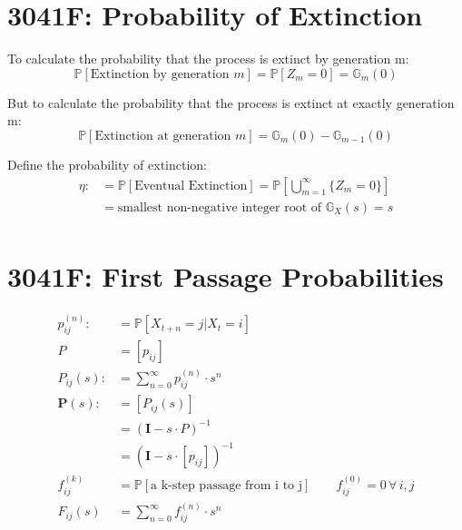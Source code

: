 \documentclass[12pt]{article}
\begin{document}
\section{3041F: Probability of Extinction}
To calculate the probability that the process is extinct by generation m:
\begin{equation*}
    \mathbb{P}[\text{Extinction by generation } m] = \mathbb{P}[Z_m = 0] = \mathbb{G}_m(0)
\end{equation*}

But to calculate the probability that the process is extinct at exactly generation m:
\begin{equation*}
    \mathbb{P}[\text{Extinction at generation } m] = \mathbb{G}_m(0) - \mathbb{G}_{m-1}(0)
\end{equation*}

Define the probability of extinction:
\begin{equation*}
    \begin{aligned}
        \eta :&= \mathbb{P}[\text{Eventual Extinction}] = \mathbb{P}\left[\bigcup_{m=1}^{\infty} \{ Z_m = 0 \}\right] \\
              &= \text{smallest non-negative integer root of } \mathbb{G}_X(s) = s \\
    \end{aligned}
\end{equation*}
\section{3041F: First Passage Probabilities}
\begin{equation*}
    \begin{aligned}
        p_{ij}^{(n)} :&= \mathbb{P}[X_{t+n} = j | X_{t} = i]  \\
        P &= \left[ p_{ij}\right]\\
        P_{ij}(s) :&= \sum_{n=0}^{\infty} p_{ij}^{(n)} \cdot s^n \\
        \mathbf{P}(s) :&= \left[ P_{ij}(s) \right]\\
                       &= \left( \mathbf{I} - s \cdot P \right)^{-1}\\
                       &= \left( \mathbf{I} - s \cdot \left[ p_{ij}\right] \right)^{-1}\\
        f_{ij}^{(k)} &= \mathbb{P}[\text{a k-step passage from i to j}] \qquad f_{ij}^{(0)} = 0 \,\forall\, i, j \\
        F_{ij}(s) &= \sum_{n=0}^{\infty} f_{ij}^{(n)} \cdot s^n \\
    \end{aligned}
\end{equation*}
\end{document}

